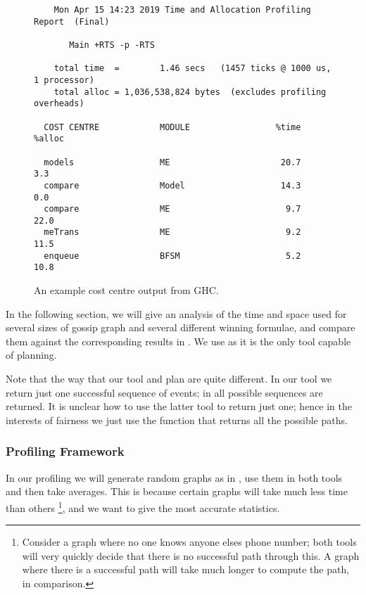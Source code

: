 \documentclass[12pt, a4paper]{article}
\begin{document}
\begin{figure}[h]
\begin{verbatim}
	Mon Apr 15 14:23 2019 Time and Allocation Profiling Report  (Final)

	   Main +RTS -p -RTS

	total time  =        1.46 secs   (1457 ticks @ 1000 us, 1 processor)
	total alloc = 1,036,538,824 bytes  (excludes profiling overheads)

  COST CENTRE            MODULE                 %time %alloc

  models                 ME                      20.7    3.3
  compare                Model                   14.3    0.0
  compare                ME                       9.7   22.0
  meTrans                ME                       9.2   11.5
  enqueue                BFSM                     5.2   10.8
\end{verbatim}
  \caption{An example cost centre output from GHC.}
  \label{fig:costcentre}
\end{figure}

In the following section, we will give an analysis of the time and space used
for several sizes of gossip graph and several different winning formulae, and
compare them against the corresponding results in \cite{GithubGossip}. We use
\cite{GithubGossip} as it is the only tool capable of planning.

Note that the way that our tool and \cite{GithubGossip} plan are quite
different. In our tool we return just one successful sequence of events; in
\cite{GithubGossip} all possible sequences are returned. It is unclear how to
use the latter tool to return just one; hence in the interests of fairness we
just use the function that returns all the possible paths.

\subsubsection{Profiling Framework}

In our profiling we will generate random graphs as in
, use them in both tools and then take averages.
This is because certain graphs will take much less time than others
\footnote{Consider a graph where no one knows anyone elses phone number; both
  tools will very quickly decide that there is no successful path through this.
  A graph where there is a successful path will take much longer to compute the
  path, in comparison.}, and we want to give the most accurate statistics.
\end{document}
